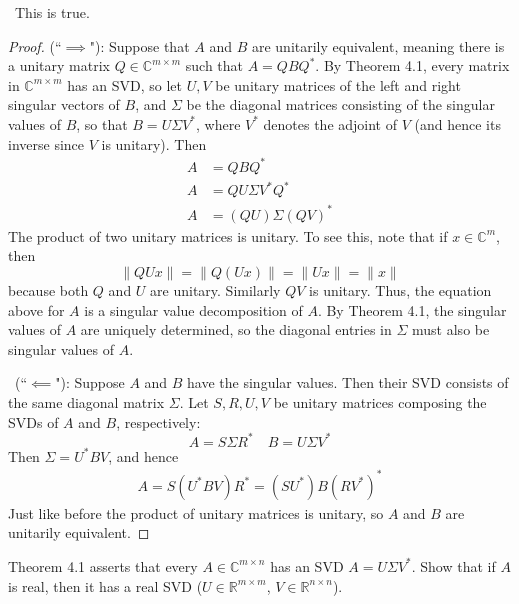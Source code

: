 \documentclass[12pt]{article}
\newenvironment{ex}[2][Exercise]{\begin{trivlist}
		\item[\hskip \labelsep {\bfseries #1}\hskip \labelsep {\bfseries #2.}]}{\end{trivlist}}
\newenvironment{sol}[1][Solution]{\begin{trivlist}
		\item[\hskip \labelsep {\bfseries #1:}]}{\end{trivlist}}
\begin{document}
\begin{sol}
	\
	This is true.
	\begin{proof}
		(``$\implies$"): Suppose that $A$ and $B$ are unitarily equivalent, meaning there is a unitary
		matrix $Q\in\mathbb{C}^{m\times m}$ such that $A=QBQ^*$. By Theorem 4.1, every matrix
		in $\mathbb{C}^{m\times m}$ has an SVD, so let $U,V$ be unitary matrices of the left and
		right singular vectors of $B$, and $\Sigma$ be the diagonal matrices consisting of the
		singular values of $B$, so that $B=U\Sigma V^*$, where $V^*$ denotes the adjoint of $V$
		(and hence its inverse since $V$ is unitary). Then
		\begin{align*}
			A &= QBQ^*\\
			A &= QU\Sigma V^*Q^*\\
			A &= (QU)\Sigma (QV)^*
		\end{align*}
		The product of two unitary matrices is unitary. To see this, note that if $x\in\mathbb{C}^m$, then
		\[
		\lVert QUx\rVert = \lVert Q(Ux)\rVert = \lVert Ux\rVert = \lVert x\rVert
		\]
		because both $Q$ and $U$ are unitary. Similarly $QV$ is unitary. Thus, the equation above for $A$
		is a singular value decomposition of $A$. By Theorem 4.1, the singular values of $A$ are uniquely
		determined, so the diagonal entries in $\Sigma$ must also be singular values of $A$.
		
		\
		(``$\impliedby$"): Suppose $A$ and $B$ have the singular values. Then their SVD consists of the same
		diagonal matrix $\Sigma$. Let $S,R,U,V$ be unitary matrices composing the SVDs of $A$ and $B$, respectively:
		\[
		A=S\Sigma R^*\quad B=U\Sigma V^*
		\]
		Then $\Sigma = U^*BV$, and hence
		\begin{align*}
			A=S(U^*BV)R^*=(SU^*)B(RV^*)^*
		\end{align*}
		Just like before the product of unitary matrices is unitary, so $A$ and $B$ are unitarily equivalent.
	\end{proof}
\end{sol}

\begin{ex}{4.5}
	Theorem 4.1 asserts that every $A\in\mathbb{C}^{m\times n}$ has an SVD $A=U\Sigma V^*$. Show that if $A$
	is real, then it has a real SVD ($U\in \mathbb{R}^{m\times m}$, $V\in\mathbb{R}^{n\times n}$).
\end{ex}
\end{document}
